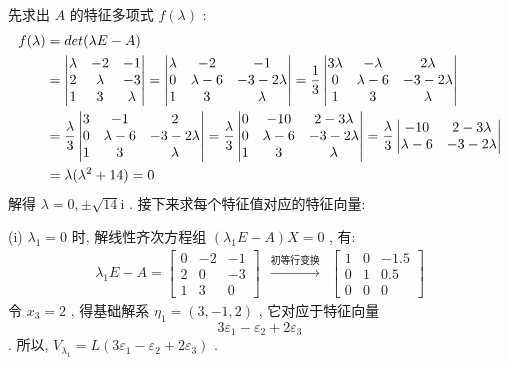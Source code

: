 \documentclass[11pt,a4paper,openany,oneside]{book}
\newcommand{\ii}{\mathrm i}
\begin{document}
先求出 $ A $ 的特征多项式 $ f(\lambda) $ :
\begin{align*}
f(\lambda)&=det(\lambda E-A)\\
&=
\begin{vmatrix}
\lambda   &   -2  &  -1  \\
2         &  \lambda  &  -3  \\
1  &  3  &  \lambda
\end{vmatrix}=
\begin{vmatrix}
\lambda  &  -2           &  -1  \\
0        &  \lambda - 6  &  -3-2\lambda  \\
1        &  3            &  \lambda
\end{vmatrix}=\dfrac{1}{3}
\begin{vmatrix}
3\lambda  &  -\lambda   &  2\lambda  \\
0        &  \lambda - 6  &  -3-2\lambda  \\
1        &  3            &  \lambda
\end{vmatrix} \notag\\ 
&= \dfrac{\lambda}{3}
\begin{vmatrix}
3  &  -1  &  2  \\
0  &  \lambda-6  &  -3-2\lambda  \\
1  &  3   &  \lambda
\end{vmatrix}=\dfrac{\lambda}{3}
\begin{vmatrix}
0  &  -10  &  2-3\lambda  \\
0  &  \lambda-6  &  -3-2\lambda  \\
1  &  3   &  \lambda
\end{vmatrix}
=\dfrac{\lambda}{3}
\begin{vmatrix}
-10  &  2-3\lambda  \\
\lambda-6  &  -3-2\lambda 
\end{vmatrix} \notag \\
&=\lambda(\lambda^2 + 14)=0  \notag
\end{align*}
解得 $ \lambda=0, \pm \sqrt{14}\ii $ . 接下来求每个特征值对应的特征向量:

(i) $ \lambda_1 = 0 $ 时, 解线性齐次方程组 $ (\lambda_1E - A)X=0 $ , 有:
\begin{gather*}
\lambda_1E-A = 
\begin{bmatrix}
0  &  -2  &  -1  \\
2  &  0  &  -3  \\
1  &  3  &  0 
\end{bmatrix} \ \ \xrightarrow{\text{初等行变换}} \ \ 
\begin{bmatrix}
1   &  0 &  -1.5  \\
0  &  1 &   0.5   \\
0  &    0   &    0
\end{bmatrix}
\end{gather*}
令 $ x_3 = 2 $ , 得基础解系 $ \eta_1 = (3, -1, 2) $ , 它对应于特征向量
 $$ 3\varepsilon_1-\varepsilon_2+2\varepsilon_3 $$ . 
所以,  $ V_{\lambda_1} = L(3\varepsilon_1-\varepsilon_2+2\varepsilon_3) $ .  \\
\end{document}

